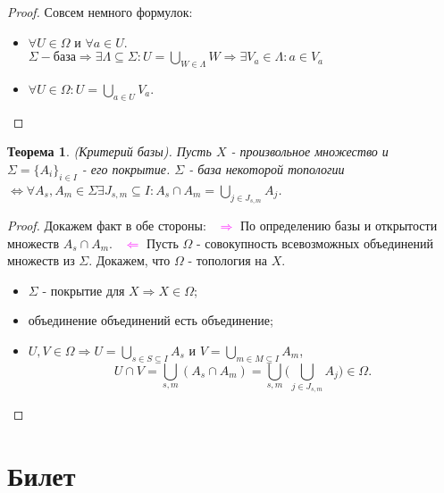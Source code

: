 \documentclass[a4paper,100pt]{article}
\theoremstyle{indented}
\newtheorem{theorem}{Теорема}
\begin{document}
\begin{proof} Совсем немного формулок: \

    \begin{itemize}
        \item $\forall U\in \Omega$ и $\forall a\in U$. \\
        $\Sigma - \text{база} \Rightarrow \exists \Lambda \subseteq \Sigma : U = \bigcup _{W\in \Lambda}W \Rightarrow \exists V_a \in \Lambda : a\in V_a$
        \item $\forall U \in \Omega : U = \bigcup_{a\in U}V_a$.
    \end{itemize}
\end{proof}

\begin{theorem}
    (\hypertarget{n17}{Критерий} базы). Пусть $X$ - произвольное множество и $\Sigma = \{ A_i \}_{i\in I}$ - его покрытие. $\Sigma$ - база некоторой топологии $\Longleftrightarrow \forall A_s, A_m \in \Sigma \exists J_{s, m}\subseteq I:A_s\cap A_m = \bigcup_{j\in J_{s, m}}A_j$.
\end{theorem}   

\begin{proof}
    Докажем факт в обе стороны: \ 
    \textcolor{magenta}{$\Rightarrow$} По определению базы и открытости множеств $A_s \cap A_m$. \ 
    \textcolor{magenta}{$\Leftarrow$} Пусть $\Omega$ - совокупность всевозможных объединений множеств из $\Sigma$. Докажем, что $\Omega $ - топология на $X$. \
    \begin{itemize}
        \item $\Sigma$ - покрытие для $X \Rightarrow X \in \Omega$;
        \item объединение объединений есть объединение;
        \item $U, V \in \Omega \Rightarrow U = \bigcup_{s\in S\subseteq I}A_s $ и $V = \bigcup_{m\in M\subseteq I} A_m$, 
        \[
            U\cap V = \bigcup_{s,m}(A_s\cap A_m) = \bigcup_{s,m}\biggl( \bigcup_{j\in J_{s,m}}A_j\biggr)\in \Omega.
        \]
    \end{itemize}

\end{proof}    

\section{Билет} \
\end{document}
